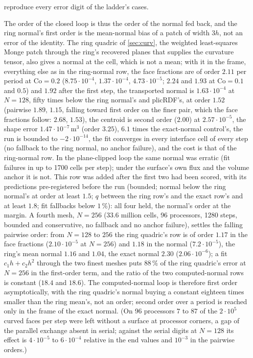\documentclass[preprint,12pt]{elsarticle}
\begin{document}
reproduce every error digit of the ladder's cases.

The order of the closed loop is thus the order of the normal fed back, and the ring normal's first order is the mean-normal bias of a patch of width $3h$, not an error of the identity. The ring quadric of \cref{sec:curv}, the weighted least-squares Monge patch through the ring's recovered planes that supplies the curvature tensor, also gives a normal at the cell, which is not a mean; with it in the frame, everything else as in the ring-normal row, the face fractions are of order $2.11$ per period at $\mathrm{Co} = 0.2$ ($8.75\cdot10^{-4}$, $1.37\cdot10^{-4}$, $4.73\cdot10^{-5}$; $2.24$ and $1.93$ at $\mathrm{Co} = 0.1$ and $0.5$) and $1.92$ after the first step, the transported normal is $1.63\cdot10^{-4}$ at $N = 128$, fifty times below the ring normal's and plicRDF's, at order $1.52$ (pairwise $1.89$, $1.15$, falling toward first order on the finer pair, which the face fractions follow: $2.68$, $1.53$), the centroid is second order ($2.00$) at $2.57\cdot10^{-5}$, the shape error $1.47\cdot10^{-7}\,\mathrm{m^3}$ (order $3.25$), $6.1$ times the exact-normal control's, the run is bounded to $-2\cdot10^{-14}$, the fit converges in every interface cell of every step (no fallback to the ring normal, no anchor failure), and the cost is that of the ring-normal row. In the plane-clipped loop the same normal was erratic (fit failures in up to 1700 cells per step); under the surface's own flux and the volume anchor it is not. This row was added after the first two had been scored, with its predictions pre-registered before the run (bounded; normal below the ring normal's at order at least $1.5$; $q$ between the ring row's and the exact row's and at least $1.8$; fit fallbacks below $1\,\%$): all four held, the normal's order at the margin. A fourth mesh, $N = 256$ ($33.6$ million cells, 96 processors, 1280 steps, bounded and conservative, no fallback and no anchor failure), settles the falling pairwise order: from $N = 128$ to $256$ the ring quadric's row is of order $1.17$ in the face fractions ($2.10\cdot10^{-5}$ at $N = 256$) and $1.18$ in the normal ($7.2\cdot10^{-5}$), the ring's mean normal $1.16$ and $1.04$, the exact normal $2.30$ ($2.06\cdot10^{-6}$); a fit $c_1 h + c_2 h^2$ through the two finest meshes puts $88\,\%$ of the ring quadric's error at $N = 256$ in the first-order term, and the ratio of the two computed-normal rows is constant ($18.4$ and $18.6$). The computed-normal loop is therefore first order asymptotically, with the ring quadric's normal buying a constant eighteen times smaller than the ring mean's, not an order; second order over a period is reached only in the frame of the exact normal. (On 96 processors $7$ to $87$ of the $2\cdot10^5$ curved faces per step were left without a surface at processor corners, a gap of the parallel exchange absent in serial; against the serial digits at $N = 128$ its effect is $4\cdot10^{-5}$ to $6\cdot10^{-4}$ relative in the end values and $10^{-3}$ in the pairwise orders.)
\end{document}
